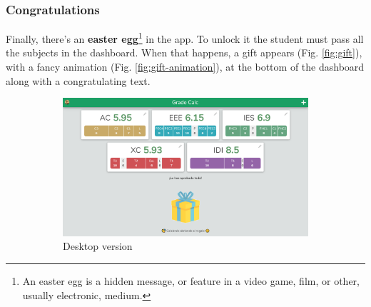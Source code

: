 \clearpage\newpage
\subsubsection{Congratulations}

Finally, there's an \textbf{easter egg}\footnote{An easter egg is a hidden message, or feature in a video game, film, or other, usually electronic, medium.} in the app. To unlock it the student must pass all the subjects in the dashboard. When that happens, a gift appears (Fig. \ref{fig:gift}), with a fancy animation (Fig. \ref{fig:gift-animation}), at the bottom of the dashboard along with a congratulating text. 


\vfill
\begin{figure}[ht!]
    \begin{subfigure}[b]{0.757\textwidth-0.1cm}
        \centering
        \includegraphics[width=\textwidth]{media/screenshots/screenshot-gift-pc.png}
        \caption{Desktop version}
    \end{subfigure}
    \hfill
    \begin{subfigure}[b]{0.243\textwidth-0.1cm}
        \centering

\end{subfigure}
\end{figure}
